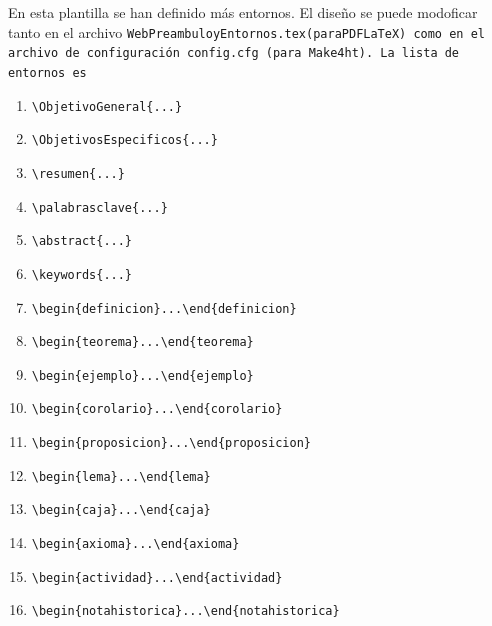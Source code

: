 \documentclass[fleqn,oneside]{article}
\begin{document}
 \bigskip
En esta plantilla se han definido más entornos. El dise\~no se puede modoficar tanto en el archivo \tt{WebPreambuloyEntornos.tex}(paraPDFLaTeX) como en el archivo de configuración \tt{config.cfg} (para Make4ht). La lista de entornos es\\



    \begin{enumerate}
        \item \lstinline+\ObjetivoGeneral{...}+
        \item \lstinline+\ObjetivosEspecificos{...}+
        \item \lstinline+\resumen{...}+
        \item \lstinline+\palabrasclave{...}+
        \item \lstinline+\abstract{...}+
        \item \lstinline+\keywords{...}+
        \item \lstinline+\begin{definicion}...\end{definicion}+
        \item \lstinline+\begin{teorema}...\end{teorema}+
        \item \lstinline+\begin{ejemplo}...\end{ejemplo}+
        \item \lstinline+\begin{corolario}...\end{corolario}+
        \item \lstinline+\begin{proposicion}...\end{proposicion}+
        \item \lstinline+\begin{lema}...\end{lema}+
        \item \lstinline+\begin{caja}...\end{caja}+
        \item \lstinline+\begin{axioma}...\end{axioma}+
        \item \lstinline+\begin{actividad}...\end{actividad}+
        \item \lstinline+\begin{notahistorica}...\end{notahistorica}+

\end{enumerate}
\end{document}
